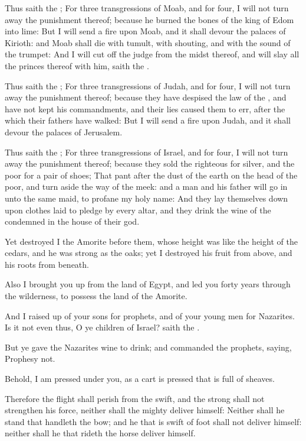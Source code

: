 \Chapter
\Verse Thus saith the \LORD; For three transgressions of Moab, and for four, I will not turn away the punishment thereof; because he burned the bones of the king of Edom into lime: \Verse But I will send a fire upon Moab, and it shall devour the palaces of Kirioth: and Moab shall die with tumult, with shouting, and with the sound of the trumpet: \Verse And I will cut off the judge from the midst thereof, and will slay all the princes thereof with him, saith the \LORD.

\Verse Thus saith the \LORD; For three transgressions of Judah, and for four, I will not turn away the punishment thereof; because they have despised the law of the \LORD, and have not kept his commandments, and their lies caused them to err, after the which their fathers have walked: \Verse But I will send a fire upon Judah, and it shall devour the palaces of Jerusalem.

\Verse Thus saith the \LORD; For three transgressions of Israel, and for four, I will not turn away the punishment thereof; because they sold the righteous for silver, and the poor for a pair of shoes; \Verse That pant after the dust of the earth on the head of the poor, and turn aside the way of the meek: and a man and his father will go in unto the same maid, to profane my holy name: \Verse And they lay themselves down upon clothes laid to pledge by every altar, and they drink the wine of the condemned in the house of their god.

\Verse Yet destroyed I the Amorite before them, whose height was like the height of the cedars, and he was strong as the oaks; yet I destroyed his fruit from above, and his roots from beneath.

\Verse Also I brought you up from the land of Egypt, and led you forty years through the wilderness, to possess the land of the Amorite.

\Verse And I raised up of your sons for prophets, and of your young men for Nazarites. Is it not even thus, O ye children of Israel? saith the \LORD.

\Verse But ye gave the Nazarites wine to drink; and commanded the prophets, saying, Prophesy not.

\Verse Behold, I am pressed under you, as a cart is pressed that is full of sheaves.

\Verse Therefore the flight shall perish from the swift, and the strong shall not strengthen his force, neither shall the mighty deliver himself: \Verse Neither shall he stand that handleth the bow; and he that is swift of foot shall not deliver himself: neither shall he that rideth the horse deliver himself.

